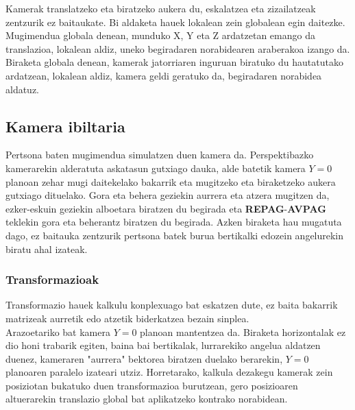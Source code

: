 \documentclass[12pt]{article}
\newcommand{\tekla}[1] {\textbf{#1}}
\begin{document}
Kamerak translatzeko eta biratzeko aukera du, eskalatzea eta zizailatzeak zentzurik ez baitaukate. Bi aldaketa hauek lokalean zein globalean egin daitezke. Mugimendua globala denean, munduko X, Y eta Z ardatzetan emango da translazioa, lokalean aldiz, uneko begiradaren norabidearen araberakoa izango da. Biraketa globala denean, kamerak jatorriaren inguruan biratuko du hautatutako ardatzean, lokalean aldiz, kamera geldi geratuko da, begiradaren norabidea aldatuz.

\subsection{Kamera ibiltaria}

Pertsona baten mugimendua simulatzen duen kamera da. Perspektibazko kamerarekin alderatuta askatasun gutxiago dauka, alde batetik kamera $Y=0$ planoan zehar mugi daitekelako bakarrik eta mugitzeko eta biraketzeko aukera gutxiago dituelako. Gora eta behera geziekin aurrera eta atzera mugitzen da, ezker-eskuin geziekin alboetara biratzen du begirada eta \tekla{REPAG}-\tekla{AVPAG} teklekin gora eta beherantz biratzen du begirada. Azken biraketa hau mugatuta dago, ez baitauka zentzurik pertsona batek burua bertikalki edozein angelurekin biratu ahal izateak.


\subsubsection{Transformazioak}

Transformazio hauek kalkulu konplexuago bat eskatzen dute, ez baita bakarrik matrizeak aurretik edo atzetik biderkatzea bezain sinplea.\\
Arazoetariko bat kamera $Y=0$ planoan mantentzea da. Biraketa horizontalak ez dio honi trabarik egiten, baina bai bertikalak, lurrarekiko angelua aldatzen duenez, kameraren "aurrera" bektorea  biratzen duelako berarekin, $Y=0$ planoaren paralelo izateari utziz. Horretarako, kalkula dezakegu kamerak zein posiziotan bukatuko duen transformazioa burutzean, gero posizioaren altuerarekin translazio global bat aplikatzeko kontrako norabidean.
\end{document}
